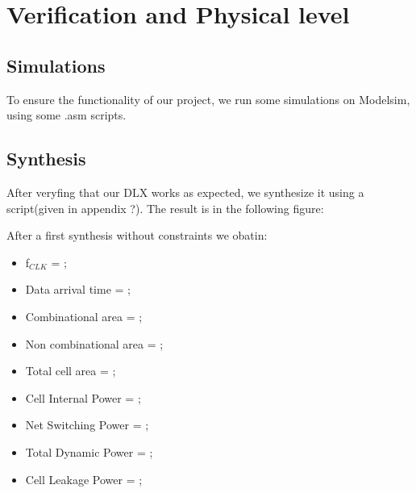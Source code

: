 %
\chapter{Verification and Physical level}
\label{chap2}

\section{Simulations}

To ensure the functionality of our project, we run some simulations on Modelsim, using some .asm scripts.



\section{Synthesis}

After veryfing that our DLX works as expected, we synthesize it using a script(given in appendix ?).
The result is in the following figure:


After a first synthesis without constraints we obatin:

\begin{itemize}
\item f$_{CLK}$ = ;\\
\item Data arrival time = ;\\
\item Combinational area = ;\\
\item Non combinational area = ;\\
\item Total cell area = ;\\
\item Cell Internal Power = ;\\
\item Net Switching Power = ;\\
\item Total Dynamic Power = ;\\
\item Cell Leakage Power = ;\\
\end{itemize}


